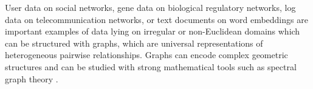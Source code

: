 \documentclass{article}
\newcommand{\bO}{\mathcal{O}}
\begin{document}


User data on social networks, gene data on biological regulatory networks, log
data on telecommunication networks, or text documents on word embeddings are
important examples of data lying on irregular or non-Euclidean domains which
can be structured with graphs, which are universal representations of
heterogeneous pairwise relationships. Graphs can encode complex geometric
structures and can be studied with strong mathematical tools such as spectral
graph theory \cite{book:Chung97Spectral}.
\end{document}
